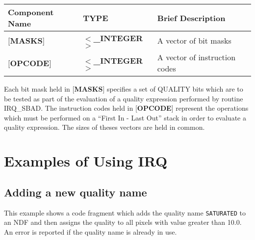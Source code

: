 \documentclass[twoside,11pt,nolof]{starlink}
\begin{document}
\begin{table}[htb]
\centering
{}
\label{TAB:QEXP}
\begin{tabular}{|l|l|l|}
\hline
Component Name & TYPE & Brief Description \\ \hline
{[}\textbf{MASKS}{]} & $<$\textbf{\_INTEGER}$>$ & A vector of bit masks\\
{[}\textbf{OPCODE}{]} & $<$\textbf{\_INTEGER}$>$ & A vector of instruction codes\\
\hline
\end{tabular}
\end{table}

Each bit mask held in {[}\textbf{MASKS}{]} specifies a set of QUALITY bits which
are to be tested as part of the evaluation of a quality expression performed by
routine IRQ\_SBAD. The instruction codes held in {[}\textbf{OPCODE}{]} represent
the operations which must be performed on a ``First In - Last Out'' stack in
order to evaluate a quality expression. The sizes of theses vectors are held in
common.

\newpage
\section {Examples of Using IRQ}
\label{APP:EXAMS}
\subsection {Adding a new quality name}

This example shows a code fragment which adds the quality name \texttt{SATURATED} to an NDF and then assigns the quality to all pixels with
value greater than 10.0. An error is reported if the quality name is
already in use.
\end{document}
